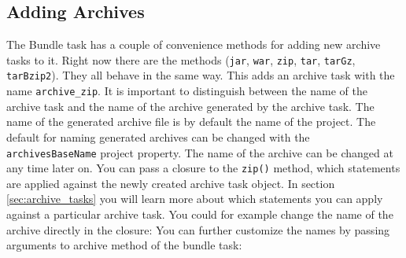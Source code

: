 \subsection{Adding Archives} %
\label{sub:adding_archives}
The Bundle task has a couple of convenience methods for adding new archive tasks to it. Right now there are the methods (\texttt{jar}, \texttt{war}, \texttt{zip}, \texttt{tar}, \texttt{tarGz}, \texttt{tarBzip2}). They all behave in the same way.
This adds an archive task with the name \texttt{archive\_zip}. It is important to distinguish between the name of the archive task and the name of the archive generated by the archive task. The name of the generated archive file is by default the name of the project. The default for naming generated archives can be changed with the \texttt{archivesBaseName} project property. The name of the archive can be changed at any time later on. You can pass a closure to the \texttt{zip()} method, which statements are applied against the newly created archive task object. In section \ref{sec:archive_tasks} you will learn more about which statements you can apply against a particular archive task. You could for example change the name of the archive directly in the closure:
You can further customize the names by passing arguments to archive method of the bundle task:

